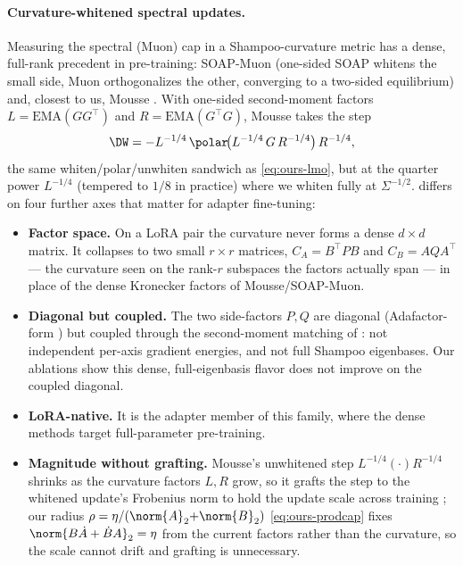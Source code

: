 \paragraph{Curvature-whitened spectral updates.} Measuring the spectral (Muon) cap in a Shampoo-curvature metric has a dense, full-rank precedent in pre-training: SOAP-Muon \cite{soapmuon} (one-sided SOAP whitens the small side, Muon orthogonalizes the other, converging to a two-sided equilibrium) and, closest to us, Mousse \cite{mousse}. With one-sided second-moment factors $L=\mathrm{EMA}(GG^\top)$ and $R=\mathrm{EMA}(G^\top G)$, Mousse takes the step
\begin{equation*}
  \DW=-L^{-1/4}\,\polar\!\big(L^{-1/4}\,G\,R^{-1/4}\big)\,R^{-1/4},
\end{equation*}
the same whiten/polar/unwhiten sandwich as \eqref{eq:ours-lmo}, but at the quarter power $L^{-1/4}$ \cite{shampoo} (tempered to $1/8$ in practice) where we whiten fully at $\Sigma^{-1/2}$. \methodname{} differs on four further axes that matter for adapter fine-tuning:
\begin{itemize}[leftmargin=1.5em,itemsep=1pt,topsep=2pt]
  \item \textbf{Factor space.} On a LoRA pair the curvature never forms a dense $d\times d$ matrix. It collapses to two small $r\times r$ matrices, $C_A=B^\top PB$ and $C_B=AQA^\top$ --- the curvature seen on the rank-$r$ subspaces the factors actually span --- in place of the dense Kronecker factors of Mousse/SOAP-Muon.
  \item \textbf{Diagonal but coupled.} The two side-factors $P,Q$ are diagonal (Adafactor-form \cite{adafactor}) but coupled through the second-moment matching of \cite{klshampoo}: not independent per-axis gradient energies, and not full Shampoo eigenbases. Our ablations show this dense, full-eigenbasis flavor does not improve on the coupled diagonal.
  \item \textbf{LoRA-native.} It is the adapter member of this family, where the dense methods target full-parameter pre-training.
  \item \textbf{Magnitude without grafting.} Mousse's unwhitened step $L^{-1/4}(\cdot)R^{-1/4}$ shrinks as the curvature factors $L,R$ grow, so it grafts the step to the whitened update's Frobenius norm to hold the update scale across training \cite{mousse}; our radius $\rho=\eta/(\norm{A}_2{+}\norm{B}_2)$ \eqref{eq:ours-prodcap} fixes $\norm{B\dot A+\dot B A}_2=\eta$ from the current factors rather than the curvature, so the scale cannot drift and grafting is unnecessary.
\end{itemize}

